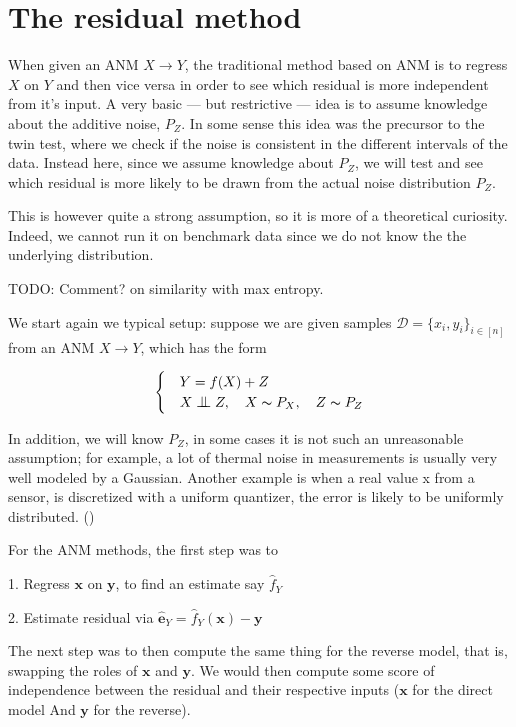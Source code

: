 \newpage
\section{The residual method}

When given an ANM $X \rightarrow Y $, the traditional method based on ANM is to regress $X$ on 
$Y$ and then vice versa in order to see which residual is more independent from it's input. A
very basic --- but restrictive --- idea is to assume knowledge about the additive noise, $P_Z$. 
In some sense this idea was the precursor to the twin test, where we check if the noise is consistent
in the different intervals of the data. Instead here, since we assume knowledge about $P_Z$, we 
will test and see which residual is more likely to be drawn from the actual noise distribution $P_Z$.

This is however quite a strong assumption, so it is more of a theoretical curiosity. Indeed, we 
cannot run it on benchmark data since we do not know the the underlying distribution. 

TODO: Comment? on similarity with max entropy.

We start again we typical setup:
suppose we are given samples $\mathcal{D} = \{x_i, y_i\}_{i \in [n]}$ from an ANM $X \rightarrow Y$, which has the form

\[
    \begin{cases} 
        & Y = f(X) + Z \\
        & X \bigCI Z,\quad X \thicksim P_X,\quad Z \thicksim P_{Z}  
     \end{cases}  
\]

In addition, we will know $P_{Z}$, in some cases it is not such an unreasonable assumption; for example, 
a lot of thermal noise in measurements is usually very well modeled by a Gaussian. Another example 
is when a real value x from a sensor, is discretized with a uniform quantizer, the error is 
likely to be uniformly distributed. (\cite{uniformCond})

For the ANM methods, the first step was to 

1. Regress $\mathbf{x}$ on $\mathbf{y}$, to find an estimate say $\hat{f}_Y$

2. Estimate residual via $\mathbf{\hat{e}}_Y = \hat{f}_Y(\mathbf{x}) - \mathbf{y}$

The next step was to then compute the same thing for the reverse model, that is, swapping the 
roles of $\mathbf{x}$ and $\mathbf{y}$. We would then compute some score of independence 
between the residual and their respective inputs ($\mathbf{x}$ for the direct model And
 $\mathbf{y}$ for the reverse). 

